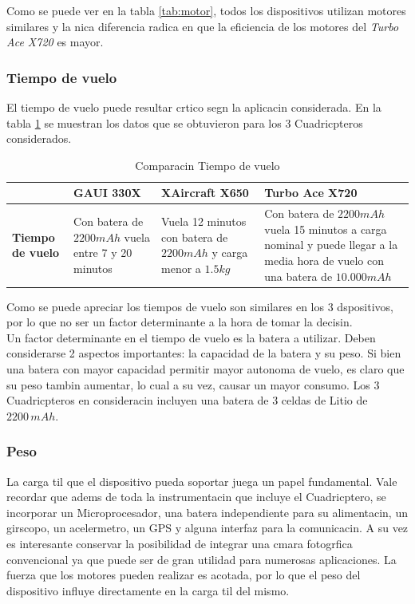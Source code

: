 \documentclass[spanish,12pt,a4paper,titlepage]{report}
\begin{document}
	Como se puede ver en la tabla \ref{tab:motor}, todos los dispositivos utilizan motores similares y la nica diferencia radica en que la eficiencia de los motores del \emph{Turbo Ace X720} es mayor.

\subsubsection*{Tiempo de vuelo}

	El tiempo de vuelo puede resultar crtico segn la aplicacin considerada. En la tabla \ref{tab:tiempo} se muestran los datos que se obtuvieron para los 3 Cuadricpteros considerados.

\begin{table}[H]
\begin{tabular}{p{40pt}|p{80pt}|p{130pt}|p{130pt}|} 
\cline{2-4}
& \cellcolor[gray]{0.8} \textbf{GAUI 330X} 
& \cellcolor[gray]{0.8} \textbf{XAircraft X650} 
& \cellcolor[gray]{0.8} \textbf{Turbo Ace X720} \\ \cline{2-4} \hline
\multicolumn{1}{|p{40pt}|}{\cellcolor[gray]{0.8}\textbf{Tiempo de vuelo}} 
& Con batera de $2200 mAh$ vuela entre 7 y 20 minutos & Vuela 12 minutos con batera de $2200mAh$ y carga menor a $1.5kg$ & Con batera de $2200mAh$ vuela 15 minutos a carga nominal y puede llegar a la media hora de vuelo con una batera de $10.000mAh$ \\ \hline
\end{tabular}
\caption{Comparacin Tiempo de vuelo}
\label{tab:tiempo}
\end{table}

	Como se puede apreciar los tiempos de vuelo son similares en los 3 dspositivos, por lo que no ser un factor determinante a la hora de tomar la decisin.\\

	Un factor determinante en el tiempo de vuelo es la batera a utilizar. Deben considerarse 2 aspectos importantes: la capacidad de la batera y su peso. Si bien una batera con mayor capacidad permitir mayor autonoma de vuelo, es claro que su peso tambin aumentar, lo cual a su vez, causar un mayor consumo. Los 3 Cuadricpteros en consideracin incluyen una batera de 3 celdas de Litio de $2200 \, mAh$.

\subsubsection*{Peso}

	La carga til que el dispositivo pueda soportar juega un papel fundamental. Vale recordar que adems de toda la instrumentacin que incluye el Cuadricptero, se incorporar un Microprocesador, una batera independiente para su alimentacin, un girscopo, un acelermetro, un GPS y alguna interfaz para la comunicacin. A su vez es interesante conservar la posibilidad de integrar una cmara fotogrfica convencional ya que puede ser de gran utilidad para numerosas aplicaciones. La fuerza que los motores pueden realizar es acotada, por lo que el peso del dispositivo influye directamente en la carga til del mismo.
\end{document}
